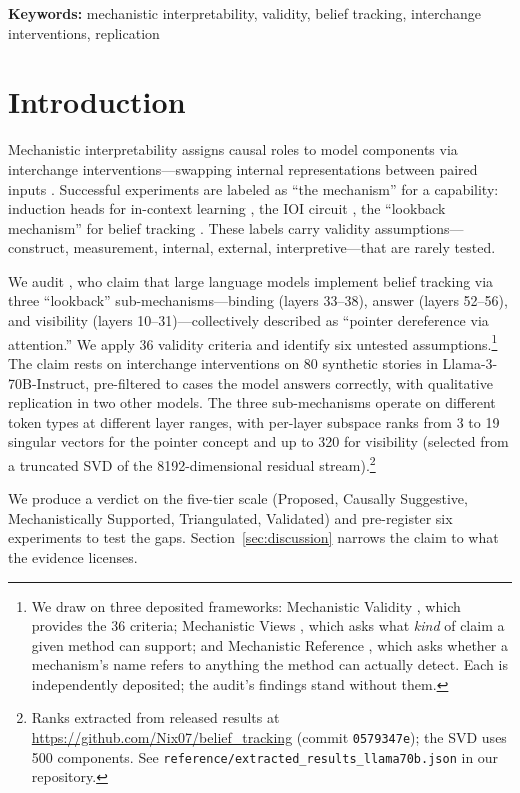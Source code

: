\documentclass{article}
\begin{document}
\noindent\textbf{Keywords:} mechanistic interpretability, validity, belief tracking, interchange interventions, replication


\section{Introduction}
\label{sec:intro}

Mechanistic interpretability assigns causal roles to model components via interchange interventions---swapping internal representations between paired inputs \citep{geiger2021causal, vig2020investigating}. Successful experiments are labeled as ``the mechanism'' for a capability: induction heads for in-context learning \citep{olsson2022context}, the IOI circuit \citep{wang2023interpretability}, the ``lookback mechanism'' for belief tracking \citep{prakash2025lookback}. These labels carry validity assumptions---construct, measurement, internal, external, interpretive---that are rarely tested.

We audit \citet{prakash2025lookback}, who claim that large language models implement belief tracking via three ``lookback'' sub-mechanisms---binding (layers 33--38), answer (layers 52--56), and visibility (layers 10--31)---collectively described as ``pointer dereference via attention.'' We apply 36 validity criteria and identify six untested assumptions.\footnote{We draw on three deposited frameworks: Mechanistic Validity \citep{tower2026mechval}, which provides the 36 criteria; Mechanistic Views \citep{tower2026mechviews}, which asks what \emph{kind} of claim a given method can support; and Mechanistic Reference \citep{tower2026mechref}, which asks whether a mechanism's name refers to anything the method can actually detect. Each is independently deposited; the audit's findings stand without them.} The claim rests on interchange interventions on 80 synthetic stories in Llama-3-70B-Instruct, pre-filtered to cases the model answers correctly, with qualitative replication in two other models. The three sub-mechanisms operate on different token types at different layer ranges, with per-layer subspace ranks from 3 to 19 singular vectors for the pointer concept and up to 320 for visibility (selected from a truncated SVD of the 8192-dimensional residual stream).\footnote{Ranks extracted from released results at \url{https://github.com/Nix07/belief_tracking} (commit \texttt{0579347e}); the SVD uses 500 components. See \texttt{reference/extracted\_results\_llama70b.json} in our repository.}

We produce a verdict on the five-tier scale (Proposed, Causally Suggestive, Mechanistically Supported, Triangulated, Validated) and pre-register six experiments to test the gaps. Section~\ref{sec:discussion} narrows the claim to what the evidence licenses.
\end{document}
